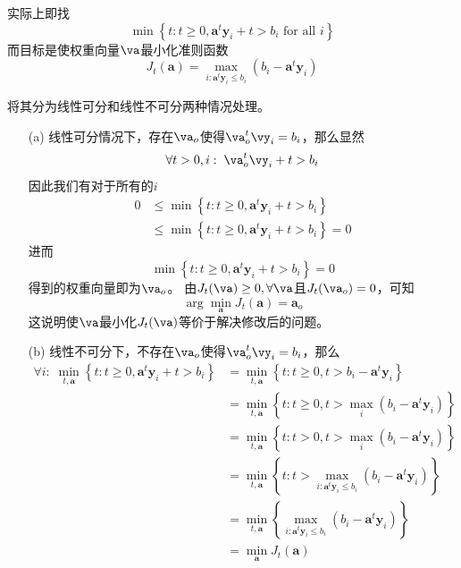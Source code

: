\documentclass[reportComp]{thesis}
\begin{document}
\begin{answer}[\textsection 5 Q28]
实际上即找
\[\min \left\{t: t \geq 0, \mathbf{a}^{t} \mathbf{y}_{i}+t>b_{i} \text { for all } i\right\}\]
而目标是使权重向量$\va$最小化准则函数
\[J_{t}(\mathbf{a})=\max _{i: \mathbf{a}^{t} \mathbf{y}_{i} \leq b_{i}}\left(b_{i}-\mathbf{a}^{t} \mathbf{y}_{i}\right)\]

将其分为线性可分和线性不可分两种情况处理。
\begin{itemize}
	\item [(a)] 线性可分情况下，存在$\va_o$使得$\va_o^t\vy_i=b_i$，那么显然
	\[\forall t>0,i:\; \va_o^t\vy_i+t > b_i\]
	因此我们有对于所有的$i$
	\[\begin{aligned}
	0 & \leq \min \left\{t: t \geq 0, \mathbf{a}^{t} \mathbf{y}_{i}+t>b_{i}\right\} \\
	 & \leq \min \left\{t: t \geq 0, \mathbf{a}^{t} \mathbf{y}_{i}+t>b_{i}\right\}=0
	\end{aligned}\]
	进而
	\[\min \left\{t: t \geq 0, \mathbf{a}^{t} \mathbf{y}_{i}+t>b_{i}\right\}=0\]
	得到的权重向量即为$\va_o$。
	由$J_t(\va)\geq 0,\forall\va$且$J_t(\va_o)=0$，可知
	\[\arg \min _{\mathbf{a}} J_{t}(\mathbf{a})=\mathbf{a}_{o}\]
	这说明使$\va$最小化$J_t(\va)$等价于解决修改后的问题。
	\item [(b)] 线性不可分下，不存在$\va_o$使得$\va_o^t\vy_i=b_i$，那么
	\[\begin{aligned}
	\forall i:\;\min _{t, \mathbf{a}}\left\{t: t \geq 0, \mathbf{a}^{t} \mathbf{y}_{i}+t>b_{i}\right\}
	&=\min _{t, \mathbf{a}}\left\{t: t \geq 0, t>b_{i}-\mathbf{a}^{t} \mathbf{y}_{i}\right\} \\
	&=\min _{t, \mathbf{a}}\left\{t: t \geq 0, t>\max _{i}\left(b_{i}-\mathbf{a}^{t} \mathbf{y}_{i}\right)\right\} \\
	&=\min _{t, \mathbf{a}}\left\{t: t>0, t>\max _{i}\left(b_{i}-\mathbf{a}^{t} \mathbf{y}_{i}\right)\right\} \\
	&=\min _{t, \mathbf{a}}\left\{t: t>\max _{i: \mathbf{a}^{t} \mathbf{y}_{i} \leq b_{i}}\left(b_{i}-\mathbf{a}^{t} \mathbf{y}_{i}\right)\right\} \\
	&=\min _{t, \mathbf{a}}\left\{\max _{i: \mathbf{a}^{t} \mathbf{y}_{i} \leq b_{i}}\left(b_{i}-\mathbf{a}^{t} \mathbf{y}_{i}\right)\right\} \\
	&=\min _{\mathbf{a}} J_{t}(\mathbf{a})
	\end{aligned}\]
\end{itemize}
\end{answer}
\end{document}
